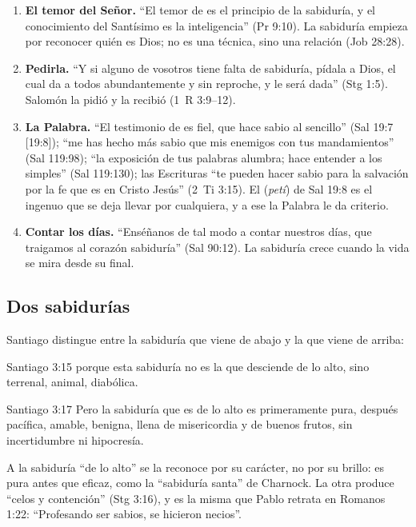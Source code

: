 \begin{enumerate}
\item \textbf{El temor del Señor.} ``El temor de \SENOR{} es el principio de la sabiduría, y el conocimiento del Santísimo es la inteligencia'' (Pr 9:10). La sabiduría empieza por reconocer quién es Dios; no es una técnica, sino una relación (Job 28:28).
\item \textbf{Pedirla.} ``Y si alguno de vosotros tiene falta de sabiduría, pídala a Dios, el cual da a todos abundantemente y sin reproche, y le será dada'' (Stg 1:5). Salomón la pidió y la recibió (1~R 3:9--12).
\item \textbf{La Palabra.} ``El testimonio de \SENOR{} es fiel, que hace sabio al sencillo'' (Sal 19:7 [19:8]); ``me has hecho más sabio que mis enemigos con tus mandamientos'' (Sal 119:98); ``la exposición de tus palabras alumbra; hace entender a los simples'' (Sal 119:130); las Escrituras ``te pueden hacer sabio para la salvación por la fe que es en Cristo Jesús'' (2~Ti 3:15). El  (\emph{petí}) de Sal 19:8 es el ingenuo que se deja llevar por cualquiera, y a ese la Palabra le da criterio.
\item \textbf{Contar los días.} ``Enséñanos de tal modo a contar nuestros días, que traigamos al corazón sabiduría'' (Sal 90:12). La sabiduría crece cuando la vida se mira desde su final.
\end{enumerate}

\subsection{Dos sabidurías}

Santiago distingue entre la sabiduría que viene de abajo y la que viene de arriba:

\begin{verso}{Santiago 3:15}
porque esta sabiduría no es la que desciende de lo alto, sino terrenal, animal, diabólica.
\end{verso}

\begin{verso}{Santiago 3:17}
Pero la sabiduría que es de lo alto es primeramente pura, después pacífica, amable, benigna, llena de misericordia y de buenos frutos, sin incertidumbre ni hipocresía.
\end{verso}

A la sabiduría ``de lo alto'' se la reconoce por su carácter, no por su brillo: es pura antes que eficaz, como la ``sabiduría santa'' de Charnock. La otra produce ``celos y contención'' (Stg 3:16), y es la misma que Pablo retrata en Romanos 1:22: ``Profesando ser sabios, se hicieron necios''.


